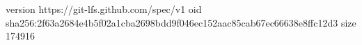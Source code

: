 version https://git-lfs.github.com/spec/v1
oid sha256:2f63a2684e4b5f02a1cba2698bdd9f046ec152aac85cab67ec66638e8ffc12d3
size 174916
